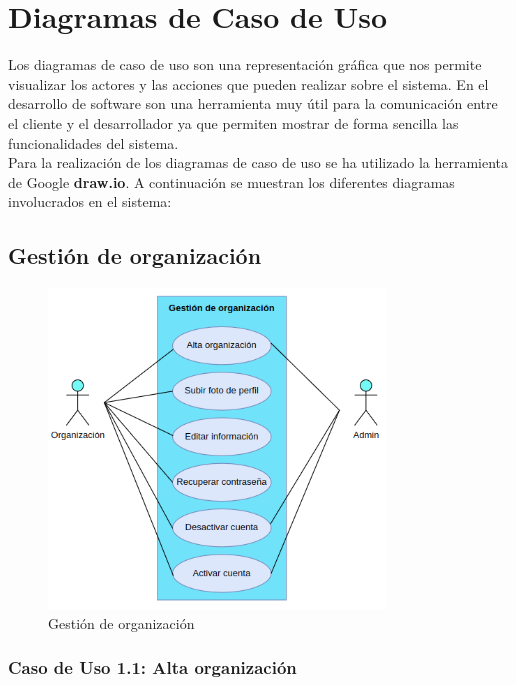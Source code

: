 \newpage

\section{Diagramas de Caso de Uso}\label{sec:diagramas-de-caso-de-uso}

Los diagramas de caso de uso son una representación gráfica que nos permite visualizar los actores y las acciones que
pueden realizar sobre el sistema. En el desarrollo de software son una herramienta muy útil para la comunicación entre
el cliente y el desarrollador ya que permiten mostrar de forma sencilla las funcionalidades del sistema. \\

Para la realización de los diagramas de caso de uso se ha utilizado la herramienta de Google \textbf{draw.io}.
A continuación se muestran los diferentes diagramas involucrados en el sistema:

\subsection{Gestión de organización}\label{subsec:gestion-de-organizacion}

\begin{figure}[H]
    \centering
    \includegraphics[width=0.8\textwidth]{imgs/gestion-organizacion}
    \caption{Gestión de organización}
    \label{fig:diagrama-caso-uso-gestion-organizacion}
\end{figure}

\subsubsection{Caso de Uso 1.1: Alta organización}\label{subsubsec:alta-organizacion}

